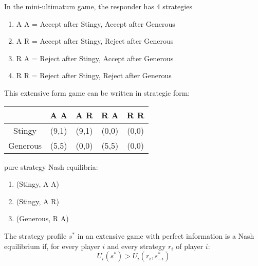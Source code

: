 \begin{example}
      In the mini-ultimatum game, the responder has 4 strategies

      \begin{enumerate}
            \item A A = Accept after Stingy, Accept after Generous
            \item A R = Accept after Stingy, Reject after Generous
            \item R A = Reject after Stingy, Accept after Generous
            \item R R = Reject after Stingy, Reject after Generous
      \end{enumerate}

      This extensive form game can be written in strategic form:
      \begin{table}[h!]
            \begin{center}
                  \begin{tabular}{ c | c c c c}
                                 & A A   & A R   & R A   & R R   \\ \hline
                        Stingy   & (9,1) & (9,1) & (0,0) & (0,0) \\
                        Generous & (5,5) & (0,0) & (5,5) & (0,0)
                  \end{tabular}
            \end{center}
      \end{table}
      pure strategy Nash equilibria:
      \begin{enumerate}
            \item (Stingy, A A)
            \item (Stingy, A R)
            \item (Generous, R A)
      \end{enumerate}
\end{example}


\begin{definition}
      The strategy profile $s^*$ in an extensive game with perfect information is a Nash
      equilibrium if, for every player $i$ and every strategy $r_i$ of player $i$:
      \[
            U_i (s^* ) > U_i (r_i , s_{-i}^* )
      \]
\end{definition}


